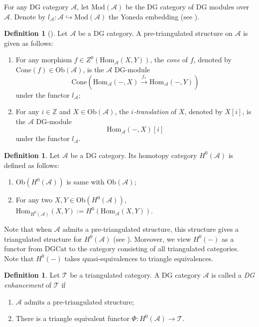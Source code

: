 \documentclass[11pt,reqno]{amsart}
\theoremstyle{definition}
\newtheorem{definition}[theorem]{Definition}
\begin{document}
For any DG category $\mathcal{A}$, let $\mathrm{Mod}(\mathcal{A})$ be the DG category of DG modules over
$\mathcal{A}$.
Denote by
$l_{\mathcal{A}}: \mathcal{A} \hookrightarrow \mathrm{Mod}(\mathcal{A})$ the Yoneda embedding
(see \cite[\S1.2]{KB0}). 


\begin{definition}[\cite{BKKK}]
Let $\mathcal{A}$ be a DG category. A pre-triangulated structure on $\mathcal{A}$ is given as follows: 

\begin{enumerate}
\item[(1)] For any morphism $f \in Z^0(\mathrm{Hom}_{\mathcal{A}}(X, Y) )$,
the {\it cone} of $f$, denoted by $
\mathrm{Cone}(f) \in \mathrm{Ob}(\mathcal{A})$, is the
$\mathcal{A}$ DG-module 
$$
\mathrm{Cone}( \mathrm{Hom}_{\mathcal{A}}(-, X) 
\xrightarrow{f_\ast} \mathrm{Hom}_{\mathcal{A}}(-, Y)  )
$$ under the functor $l_{\mathcal{A}}$; 

\item[(2)] For any $i \in \mathbb{Z}$ and $X \in \mathrm{Ob}(\mathcal{A})$, 
the {\it $i$-translation} of $X$, denoted by $X[i]$, is the 
$\mathcal{A}$ DG-module 
$$
\mathrm{Hom}_{\mathcal{A}}(-, X)[i]
$$
under the functor $l_{\mathcal{A}}$. 
\end{enumerate}	
\end{definition}


\begin{definition}
Let $\mathcal{A}$ be a DG category. 
Its homotopy category 
$H^{0}(\mathcal{A})$ is defined as follows: 
\begin{enumerate}
\item [(1)] $\mathrm{Ob}(H^{0}(\mathcal{A}))$ is same with 
$\mathrm{Ob}(\mathcal{A})$;

\item [(2)] For any two $X, Y \in \mathrm{Ob}(H^{0}(\mathcal{A}) )$, 
$\mathrm{Hom}_{H^{0}(\mathcal{A})}(X, Y) 
:= H^0 (\mathrm{Hom}_{\mathcal{A}}(X, Y) )$.
\end{enumerate}
\end{definition}
Note that when $\mathcal{A}$ admits a pre-triangulated structure, 
this structure gives a triangulated structure 
for $H^{0}(\mathcal{A})$ (see \cite[\S 2.1 ]{KB1}). 
Moreover, 
we view $H^{0}(-)$ as a functor from $\mathrm{DGCat}$ 
to the category consisting of all triangulated categories.  
Note that $H^{0}(-)$ takes quasi-equivalences to triangle equivalences. 

\begin{definition}
Let $\mathcal{T}$ be a triangulated category. A DG category 
$\mathcal{A}$ is called a {\it DG enhancement} of 	
$\mathcal{T}$ if 
\begin{enumerate}
\item [(1)] $\mathcal{A}$ admits a pre-triangulated structure;

\item [(2)] There is a triangle equivalent functor $\Phi: H^{0}(\mathcal{A}) \rightarrow \mathcal{T}$. 
\end{enumerate}
\end{definition}
\end{document}
